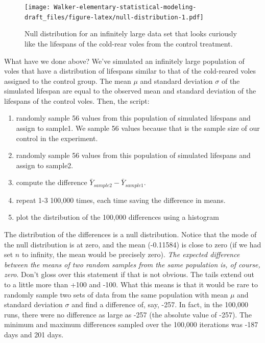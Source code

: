 \documentclass[]{book}
\providecommand{\tightlist}{%
  \setlength{\itemsep}{0pt}\setlength{\parskip}{0pt}}
\begin{document}
\begin{figure}
\centering
\texttt{[image: Walker-elementary-statistical-modeling-draft\_files/figure-latex/null-distribution-1.pdf]}
\caption{\label{fig:null-distribution}Null distribution for an infinitely
large data set that looks curiously like the lifespans of the cold-rear
voles from the control treatment.}
\end{figure}

What have we done above? We've simulated an infinitely large population
of voles that have a distribution of lifespans similar to that of the
cold-reared voles assigned to the control group. The mean \(\mu\) and
standard deviation \(\sigma\) of the simulated lifespan are equal to the
observed mean and standard deviation of the lifespans of the control
voles. Then, the script:

\begin{enumerate}
\def\labelenumi{\arabic{enumi}.}
\tightlist
\item
  randomly sample 56 values from this population of simulated lifespans
  and assign to sample1. We sample 56 values because that is the sample
  size of our control in the experiment.
\item
  randomly sample 56 values from this population of simulated lifespans
  and assign to sample2.
\item
  compute the difference \(\bar{Y}_{sample2} - \bar{Y}_{sample1}\).
\item
  repeat 1-3 100,000 times, each time saving the difference in means.
\item
  plot the distribution of the 100,000 differences using a histogram
\end{enumerate}

The distribution of the differences is a null distribution. Notice that
the mode of the null distribution is at zero, and the mean (-0.11584) is
close to zero (if we had set \(n\) to infinity, the mean would be
precisely zero). \emph{The expected difference between the means of two
random samples from the same population is, of course, zero}. Don't
gloss over this statement if that is not obvious. The tails extend out
to a little more than +100 and -100. What this means is that it would be
rare to randomly sample two sets of data from the same population with
mean \(\mu\) and standard deviation \(\sigma\) and find a difference of,
say, -257. In fact, in the 100,000 runs, there were no difference as
large as \textbar{}-257\textbar{} (the absolute value of -257). The
minimum and maximum differences sampled over the 100,000 iterations was
-187 days and 201 days.
\end{document}
